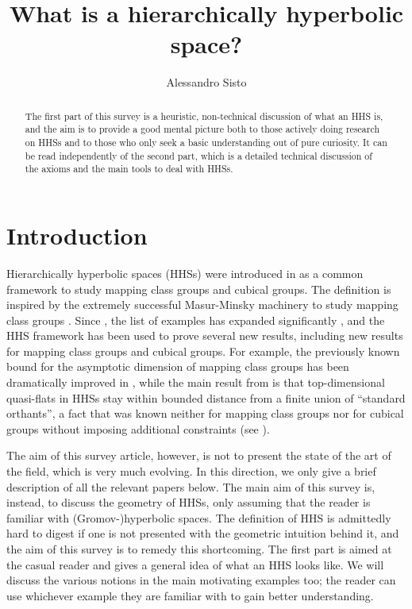 \documentclass[11pt,oneside]{amsart}
\newcounter{ax}
\theoremstyle{definition}
\begin{document}
\title{What is a hierarchically hyperbolic space?}

\author[A. Sisto]{Alessandro Sisto}
\address{Department of Mathematics, ETH Zurich, 8092 Zurich, Switzerland}

\maketitle

\begin{abstract}
 The first part of this survey is a heuristic, non-technical discussion of what an HHS is, and the aim is to provide a good mental picture both to those actively doing research on HHSs and to those who only seek a basic understanding out of pure curiosity. It can be read independently of the second part, which is a detailed technical discussion of the axioms and the main tools to deal with HHSs.
\end{abstract}




\setcounter{tocdepth}{2}
\setcounter{secnumdepth}{2}
\tableofcontents

\section*{Introduction}

Hierarchically hyperbolic spaces (HHSs) were introduced in \cite{HHS1} as a common framework to study mapping class groups and cubical groups. The definition is inspired by the extremely successful Masur-Minsky machinery to study mapping class groups \cite{MM1,MM2,Behrstock_thesis}. Since \cite{HHS1}, the list of examples has expanded significantly \cite{HHS2,HHS_asdim,HagenSusse}, and the HHS framework has been used to prove several new results, including new results for mapping class groups and cubical groups. For example, the previously known bound for the asymptotic dimension of mapping class groups has been dramatically improved in \cite{HHS_asdim}, while the main result from \cite{HHS_quasiflats} is that top-dimensional quasi-flats in HHSs stay within bounded distance from a finite union of ``standard orthants'', a fact that was known neither for mapping class groups nor for cubical groups without imposing additional constraints (see \cite{Huang:quasiflats}).

The aim of this survey article, however, is not to present the state of the art of the field, which is very much evolving. In this direction, we only give a brief description of all the relevant papers below. The main aim of this survey is, instead, to discuss the geometry of HHSs, only assuming that the reader is familiar with (Gromov-)hyperbolic spaces. The definition of HHS is admittedly hard to digest if one is not presented with the geometric intuition behind it, and the aim of this survey is to remedy this shortcoming. The first part is aimed at the casual reader and gives a general idea of what an HHS looks like. We will discuss the various notions in the main motivating examples too; the reader can use whichever example they are familiar with to gain better understanding.
\end{document}
